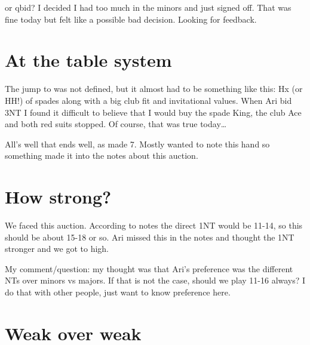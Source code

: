 \documentclass[tom-ari]{subfile}
\begin{document}

 or qbid?  I decided I had too much in the minors and just signed off.  That was fine today but felt like a possible bad decision.  Looking for feedback.

\section{At the table system}
\begin{handdiagram}
\end{handdiagram}


The jump to  was not defined, but it almost had to be something like this:  Hx (or HH!) of spades along with a big club fit and invitational values.  When Ari bid 3NT I found it difficult to believe that I would buy the spade King, the club Ace and both red suits stopped.  Of course, that was true today\ldots

All's well that ends well, as  made 7.  Mostly wanted to note this hand so something made it into the notes about this auction.  

\section{How strong?}

We faced this auction.  According to notes the direct 1NT would be 11-14, so this should be about 15-18 or so.  Ari missed this in the notes and thought the 1NT stronger and we got to high.

My comment/question:  my thought was that Ari's preference was the different NTs over minors vs majors.  If that is not the case, should we play 11-16 always?  I do that with other people, just want to know preference here.

\section{Weak over weak}
\begin{handdiagram}
\end{handdiagram}
\end{document}
